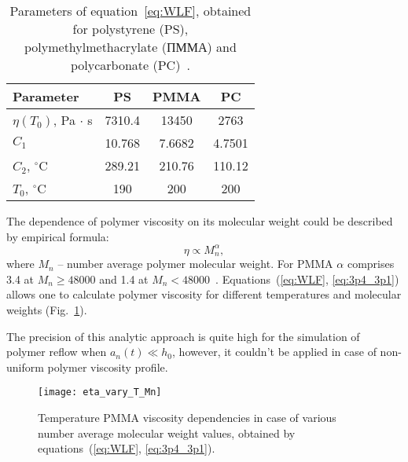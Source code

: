 \documentclass[12pt, letterpaper]{article}
\begin{document}
\begin{table}[h]
	\centering
	\caption{Parameters of equation~\ref{eq:WLF}, obtained for polystyrene (PS), polymethylmethacrylate (ПММА) and polycarbonate (PC)~\cite{aho2008measurement_WLF}.}
	\begin{tabular}{l c c c}
		\hline
		Parameter \hspace{1em} & PS \hspace{1em} & PMMA \hspace{1em} & PC \\ \hline
		$\eta(T_0)$, Pa $\cdot$ s \hspace{1em} & 7310.4 \hspace{1em} & 13450 \hspace{1em} & 2763 \\
		$C_1$ \hspace{1em} & 10.768 \hspace{1em} & 7.6682 \hspace{1em} & 4.7501 \\
		$C_2$, $^\circ$C \hspace{1em} & 289.21 \hspace{1em} & 210.76 \hspace{1em} & 110.12 \\
		$T_0$, $^\circ$C \hspace{1em} & 190 \hspace{1em} & 200 \hspace{1em} & 200 \\
		\hline
	\end{tabular}
	\label{table:WLF}
\end{table}


The dependence of polymer viscosity on its molecular weight could be described by empirical formula:
\begin{equation} \label{eq:3p4_3p1}
	\eta \propto M_n^\alpha,
\end{equation}
where $M_n$ -- number average polymer molecular weight. For PMMA $\alpha$ comprises 3.4 at $M_n \geq 48 000$ and 1.4 at $M_n < 48 000$~\cite{Leveder_2010, Bueche_3p4_1p4}. Equations~(\ref{eq:WLF}, \ref{eq:3p4_3p1}) allows one to calculate polymer viscosity for different temperatures and molecular weights (Fig.~\ref{fig:eta_vary_T_Mn}).

The precision of this analytic approach is quite high for the simulation of polymer reflow when $a_n(t) \ll h_0$, however, it couldn't be applied in case of non-uniform polymer viscosity profile.


\begin{figure}[h]
	\begin{center}
		\texttt{[image: eta\_vary\_T\_Mn]}
	\end{center}
	\vspace{-2em}
	\caption{Temperature PMMA viscosity dependencies in case of various number average molecular weight values, obtained by equations~(\ref{eq:WLF}, \ref{eq:3p4_3p1}).}
	\label{fig:eta_vary_T_Mn}
\end{figure}
\end{document}
